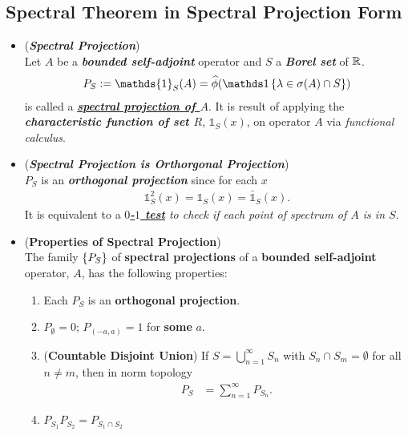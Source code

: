 \documentclass[11pt]{article}
\begin{document}
\subsection{Spectral Theorem in Spectral Projection Form}
\begin{itemize}
\item \begin{definition} (\emph{\textbf{Spectral Projection}})\\
Let $A$ be a \textbf{\emph{bounded self-adjoint}} operator and $S$ a \emph{\textbf{Borel set}} of ${\mathbb R}$. 
\begin{align*}
P_{S} := \mathds{1}_{S}(A) = \widehat{\phi}(\ind{\lambda\in \sigma(A) \cap S})
\end{align*} is called a  \underline{\emph{\textbf{spectral projection of $A$}}}. It is result of applying the \emph{\textbf{characteristic function of set $R$}}, $\mathds{1}_{S}(x)$, on operator $A$ via \emph{functional calculus}.
\end{definition}

\item \begin{remark} (\emph{\textbf{Spectral Projection is Orthorgonal Projection}})\\
$P_{S}$ is an \emph{\textbf{orthogonal projection}} since for each $x$
\begin{align*}
\mathds{1}_{S}^2(x) = \mathds{1}_{S}(x) = \bar{\mathds{1}}_{S}(x).
\end{align*} It is equivalent to a \emph{\textbf{\underline{$0$-$1$ test}}  to check if each point of spectrum of $A$ is in $S$}.
\end{remark}

\item \begin{proposition}  (\textbf{Properties of Spectral Projection}) \citep{reed1980methods}\\
The family $\left\{P_{S}\right\}$ of \textbf{spectral projections} of a \textbf{bounded self-adjoint} operator, $A$, has the following properties: 
\begin{enumerate}
\item Each $P_{S}$ is an \textbf{orthogonal projection}. 
\item $P_{\emptyset} = 0$;  $P_{(-a, a)} = 1$ for \textbf{some} $a$.
\item (\textbf{Countable Disjoint Union}) If $S = \bigcup_{n=1}^{\infty}S_n$ with $S_n \cap S_{m} = \emptyset$ for all $n \neq m$, then in norm topology
\begin{align*}
P_{S} &= \sum_{n=1}^{\infty}P_{S_n}.
\end{align*} 
\item $P_{S_1}P_{S_2} = P_{S_1 \cap S_2}$
\end{enumerate}
\end{proposition}


\end{itemize}
\end{document}
